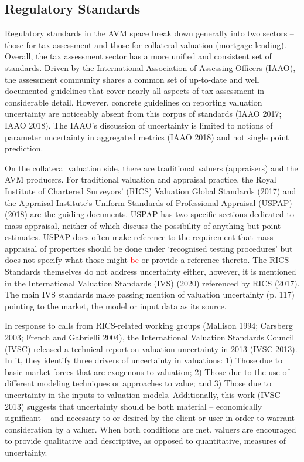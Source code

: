 \documentclass[colTwo]{anon}
\theoremstyle{definition}
\begin{document}
\subsection{Regulatory Standards}

Regulatory standards in the AVM space break down generally into two sectors -- those for tax assessment and those for collateral valuation (mortgage lending).  Overall, the tax assessment sector has a more unified and consistent set of standards.  Driven by the International Association of Assessing Officers (IAAO), the assessment community shares a common set of up-to-date and well documented guidelines that cover nearly all aspects of tax assessment in considerable detail.  However, concrete guidelines on reporting valuation uncertainty are noticeably absent from this corpus of standards (IAAO 2017; IAAO 2018). The IAAO's discussion of uncertainty is limited to notions of parameter uncertainty in aggregated metrics (IAAO 2018) and not single point prediction.  

On the collateral valuation side, there are traditional valuers (appraisers) and the AVM producers. For traditional valuation and appraisal practice, the Royal Institute of Chartered Surveyors’ (RICS) Valuation Global Standards (2017) and the Appraisal Institute’s Uniform Standards of Professional Appraisal (USPAP) (2018) are the guiding documents. USPAP has two specific sections dedicated to mass appraisal, neither of which discuss the possibility of anything but point estimates. USPAP does often make reference to the requirement that mass appraisal of properties should be done under ‘recognised testing procedures’ but does not specify what those might \textcolor{red}{be} or provide a reference thereto. The RICS Standards themselves do not address uncertainty either, however, it is mentioned in the International Valuation Standards (IVS) (2020) referenced by RICS (2017).  The main IVS standards make passing mention of valuation uncertainty (p. 117) pointing to the market, the model or input data as its source.  

In response to calls from RICS-related working groups (Mallison 1994; Carsberg 2003; French and Gabrielli 2004), the International Valuation Standards Council (IVSC) released a technical report on valuation uncertainty in 2013 (IVSC 2013).  In it, they identify three drivers of uncertainty in valuations: 1) Those due to basic market forces that are exogenous to valuation; 2) Those due to the use of different modeling techniques or approaches to value; and 3) Those due to uncertainty in the inputs to valuation models. Additionally, this work (IVSC 2013) suggests that uncertainty should be both material -- economically significant -- and necessary to or desired by the client or user in order to warrant consideration by a valuer. When both conditions are met, valuers are encouraged to provide qualitative and descriptive, as opposed to quantitative, measures of uncertainty.     
\end{document}
